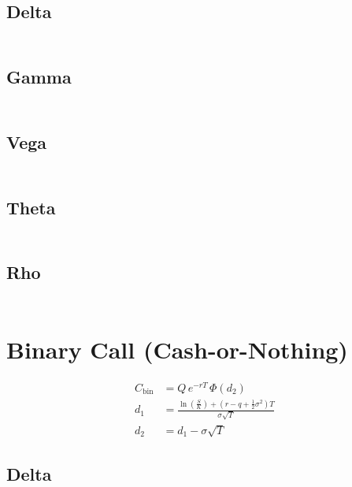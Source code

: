 \documentclass[12pt,a4paper]{article}
\begin{document}
\subsection{Delta}
\[
  \begin{aligned}
  \end{aligned}
\]

\subsection{Gamma}
\[
  \begin{aligned}
  \end{aligned}
\]

\subsection{Vega}
\[
  \begin{aligned}
  \end{aligned}
\]

\subsection{Theta}
\[
  \begin{aligned}
  \end{aligned}
\]

\subsection{Rho}
\[
  \begin{aligned}
  \end{aligned}
\]

\section{Binary Call (Cash-or-Nothing)}

\[
  \begin{aligned}
    C_{\mathrm{bin}} & = Q \, e^{-rT} \,\Phi(d_2)                                 \\ d_1 & = \frac{\ln\!
    \left(\tfrac{S}{K}\right) + (r - q + \tfrac{1}{2}\sigma^2)T}{\sigma \sqrt{T}} \\
    d_2              & = d_1 - \sigma \sqrt{T}
  \end{aligned}
\]

\subsection{Delta}
\[
  \begin{aligned}
  \end{aligned}
\]
\end{document}
